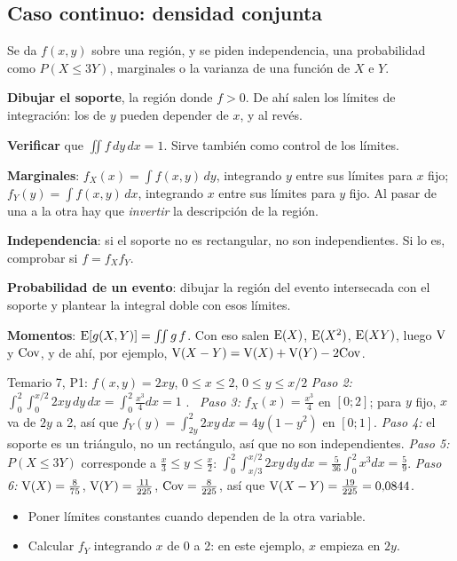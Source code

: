 \subsection{Caso continuo: densidad conjunta}\label{p:continuo}
\begin{cuando}
Se da $f(x,y)$ sobre una región, y se piden independencia, una probabilidad como $P(X\le3Y)$, marginales o la varianza de una función de $X$ e $Y$.
\end{cuando}
\begin{pasos}
\begin{pasolista}
\item \textbf{Dibujar el soporte}, la región donde $f>0$. De ahí salen los límites de integración: los de $y$ pueden depender de $x$, y al revés.
\item \textbf{Verificar} que $\iint f\,dy\,dx=1$. Sirve también como control de los límites.
\item \textbf{Marginales}: $f_X(x)=\int f(x,y)\,dy$, integrando $y$ entre sus límites para $x$ fijo; $f_Y(y)=\int f(x,y)\,dx$, integrando $x$ entre sus límites para $y$ fijo. Al pasar de una a la otra hay que \emph{invertir} la descripción de la región.
\item \textbf{Independencia}: si el soporte no es rectangular, no son independientes. Si lo es, comprobar si $f=f_Xf_Y$.
\item \textbf{Probabilidad de un evento}: dibujar la región del evento intersecada con el soporte y plantear la integral doble con esos límites.
\item \textbf{Momentos}: $\mathrm{E}[g(X,Y)]=\iint g\,f$. Con eso salen $\mathrm{E}(X)$, $\mathrm{E}(X^2)$, $\mathrm{E}(XY)$, luego $\mathrm{V}$ y $\mathrm{Cov}$, y de ahí, por ejemplo, $\mathrm{V}(X-Y)=\mathrm{V}(X)+\mathrm{V}(Y)-2\mathrm{Cov}$.
\end{pasolista}
\end{pasos}
\begin{modelo}{Temario 7, P1: $f(x,y)=2xy$, $0\le x\le2$, $0\le y\le x/2$}
\emph{Paso 2:} $\int_0^2\!\int_0^{x/2}2xy\,dy\,dx=\int_0^2\frac{x^3}{4}dx=1$ \checkmark. \
\emph{Paso 3:} $f_X(x)=\frac{x^3}{4}$ en $[0;2]$; para $y$ fijo, $x$ va de $2y$ a 2, así que $f_Y(y)=\int_{2y}^2 2xy\,dx=4y(1-y^2)$ en $[0;1]$.
\emph{Paso 4:} el soporte es un triángulo, no un rectángulo, así que no son independientes.
\emph{Paso 5:} $P(X\le3Y)$ corresponde a $\frac x3\le y\le\frac x2$: $\int_0^2\!\int_{x/3}^{x/2}2xy\,dy\,dx=\frac5{36}\int_0^2x^3dx=\frac59$.
\emph{Paso 6:} $\mathrm{V}(X)=\frac8{75}$, $\mathrm{V}(Y)=\frac{11}{225}$, $\mathrm{Cov}=\frac8{225}$, así que $\mathrm{V}(X-Y)=\frac{19}{225}=0{,}0844$.
\end{modelo}
\begin{ojo}
\begin{itemize}
\item Poner límites constantes cuando dependen de la otra variable.
\item Calcular $f_Y$ integrando $x$ de 0 a 2: en este ejemplo, $x$ empieza en $2y$.
\end{itemize}
\end{ojo}
